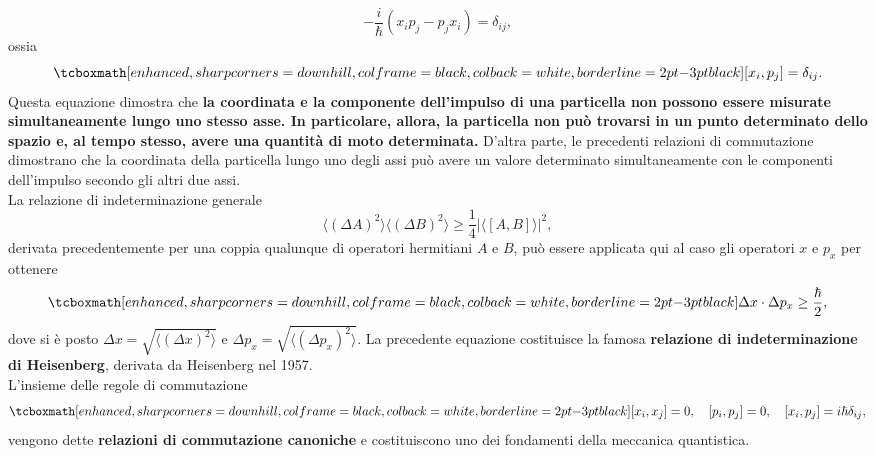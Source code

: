\documentclass[a4paper,12pt,oneside]{book}
\begin{document}
	\begin{equation}
		-\frac{i}{\hbar}\left( x_ip_j-p_jx_i\right) =\delta _{ij},
	\end{equation}
ossia
	\begin{equation}
		\tcboxmath[enhanced, sharp corners=downhill, colframe=black, colback=white, borderline={2pt}{-3pt}{black}]{
			\left[ x_i, p_j \right] =\delta _{ij}.
			}
	\end{equation}
Questa equazione dimostra che \textbf{la coordinata e la componente dell'impulso di una particella non possono essere misurate simultaneamente lungo uno stesso asse. In particolare, allora, la particella non può trovarsi in un punto determinato dello spazio e, al tempo stesso, avere una quantità di moto determinata.} D'altra parte, le precedenti relazioni di commutazione dimostrano che la coordinata della particella lungo uno degli assi può avere un valore determinato simultaneamente con le componenti dell'impulso secondo gli altri due assi.\\

La relazione di indeterminazione generale
	\begin{equation}
		\langle \left( \Delta A\right)^2\rangle \langle \left( \Delta B\right)^2\rangle \geq \frac{1}{4}\vert \langle \left[A,B\right] \rangle \vert ^2 ,
	\end{equation}
derivata precedentemente per una coppia qualunque di operatori hermitiani $A$ e $B$, può essere applicata qui al caso gli operatori $x$ e $p_x$ per ottenere
	\begin{equation}
		\tcboxmath[enhanced, sharp corners=downhill, colframe=black, colback=white, borderline={2pt}{-3pt}{black}]{
			\Delta x \cdot \Delta p_x \geq \frac{\hbar}{2} ,
			}
	\end{equation}
dove si è posto $\Delta x = \sqrt{\langle\left(\Delta x\right) ^2\rangle}$ e $\Delta p_x = \sqrt{\langle\left(\Delta p_x\right) ^2\rangle}$. La precedente equazione costituisce la famosa \textbf{relazione di indeterminazione di Heisenberg}, derivata da Heisenberg nel 1957.\\

L'insieme delle regole di commutazione
	\begin{equation}
		\tcboxmath[enhanced, sharp corners=downhill, colframe=black, colback=white, borderline={2pt}{-3pt}{black}]{
			\left[ x_i, x_j\right]=0, \quad \left[ p_i, p_j\right]=0, \quad \left[ x_i, p_j\right]=i\hbar \delta _{ij},
			} 
	\end{equation}
vengono dette \textbf{relazioni di commutazione canoniche} e costituiscono uno dei fondamenti della meccanica quantistica.\\
\end{document}
